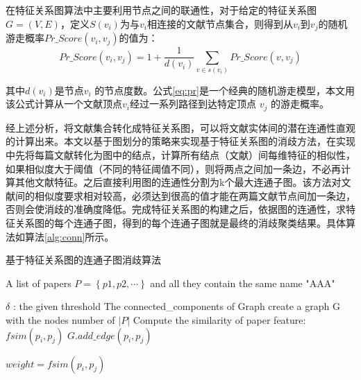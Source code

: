 \documentclass[sigchi]{acmart}
\begin{document}
在特征关系图算法中主要利用节点之间的联通性，对于给定的特征关系图 $ G= \left ( V,E\right ) $，定义$ S(v_{i}) $为与$ v_{i} $相连接的文献节点集合，则得到从$ v_{i} $到$ v_{j} $的随机游走概率$ Pr\_Score\left ( v_{i},v_{j}\right ) $的值为：
\begin{equation}
\label{eq:pr}
Pr\_Score\left ( v_{i},v_{j}\right )=1+\frac{1}{d\left ( v_{i}\right )} \sum_{v\in s\left ( v_{i}\right )}^{}Pr\_Score\left ( v,v_{j}\right )
\end{equation}

其中$d\left(v_{i}\right)$是节点$v_{i}$ 的节点度数。公式\ref{eq:pr}是一个经典的随机游走模型\cite{aldous1989lower}，本文用该公式计算从一个文献顶点$ v_{i} $经过一系列路径到达特定顶点 $v_{j}$ 的游走概率。

经上述分析，将文献集合转化成特征关系图，可以将文献实体间的潜在连通性直观的计算出来。本文以基于图划分的策略来实现基于特征关系图的消歧方法，在实现中先将每篇文献转化为图中的结点，计算所有结点（文献）间每维特征的相似性，如果相似度大于阈值（不同的特征阈值不同），则将两点之间加一条边，不必再计算其他文献特征。之后直接利用图的连通性分割为k个最大连通子图。该方法对文献间的相似度要求相对较高，必须达到很高的值才能在两篇文献节点间加一条边，否则会使消歧的准确度降低。完成特征关系图的构建之后，依据图的连通性，求特征关系图的每个连通子图，得到的每个连通子图就是最终的消歧聚类结果。具体算法如算法\ref{alg:conn}所示。

\begin{algorithm}  
  \caption{基于特征关系图的连通子图消歧算法}
  \label{alg:conn}  
  \begin{algorithmic}[1] %
    \Require A list of papers $ P=\left\{p1,p2,\cdots\right\} $ and all they contain the same name "AAA" 
    
$\delta$ : the given threshold
    \Ensure The connected\_components of Graph
    \State create a graph G with the nodes number of $\left | P\right |$
        \State Compute the similarity of paper feature: $fsim\left(p_{i},p_{j}\right)$
        \State $G.add\_edge \left(p_{i},p_{j}\right)$

        \State $weight=fsim\left(p_{i},p_{j}\right)$
        \EndIf
      \EndFor
    \EndFor
    \State {}  
    \EndFunction    
  \end{algorithmic}  
\end{algorithm}
\end{document}
